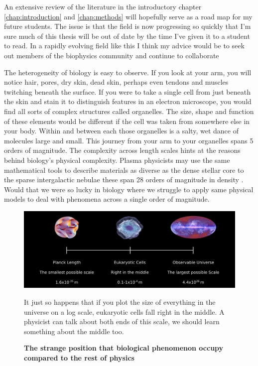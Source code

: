 An extensive review of the literature in the introductory chapter \ref{chap:introduction} and \ref{chap:methods} will hopefully serve as a road map for my future students. The issue is that the field is now progressing so quickly that I'm sure much of this thesis will be out of date by the time I've given it to a student to read. In a rapidly evolving field like this I think my advice would be to seek out members of the biophysics community and continue to collaborate

The heterogeneity of biology is easy to observe. If you look at your arm, you will notice hair, pores, dry skin, dead skin, perhaps even tendons and muscles twitching beneath the surface. If you were to take a single cell from just beneath the skin and stain it to distinguish features in an electron microscope, you would find all sorts of complex structures called organelles. The size, shape and function of these elements would be different if the cell was taken from somewhere else in your body. Within and between each those organelles is a salty, wet dance of molecules large and small. This journey from your arm to your organelles spans 5 orders of magnitude. The complexity across length scales hints at the reasons behind biology's physical complexity. Plasma physicists may use the same mathematical tools to describe materials as diverse as the dense stellar core to the sparse intergalactic nebulae these span 28 orders of magnitude in density \cite{chen2018}. Would that we were so lucky in biology where we struggle to apply same physical models to deal with phenomena across a single order of magnitude.  


\begin{figure}
	\begin{center}
		\includegraphics[width=1.0\textwidth]{figures/scales.png}
	\end{center}
	\captionsetup{singlelinecheck = false, justification=raggedright}
	\caption[The strange position that biological phenomenon occupy compared to the rest of physics] {\textbf{The strange position that biological phenomenon occupy compared to the rest of physics}}{It just so happens that if you plot the size of everything  in the universe on a log scale, eukaryotic cells fall right in the middle. A physicist can talk about both ends of this scale, we should learn something about the middle too.}
	\label{biology_scales}
\end{figure}


